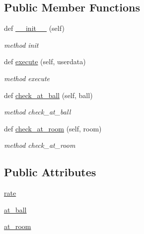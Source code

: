 \subsection*{Public Member Functions}
\begin{DoxyCompactItemize}
\item 
def \hyperlink{classbehavior__manager_1_1Find__track__behaviour_a1c9e21684b80b7c55250e5c51db162ef}{\+\_\+\+\_\+init\+\_\+\+\_\+} (self)
\begin{DoxyCompactList}\small\item\em method init \end{DoxyCompactList}\item 
def \hyperlink{classbehavior__manager_1_1Find__track__behaviour_abc08716d3814807c7e310a1726b1f0d2}{execute} (self, userdata)
\begin{DoxyCompactList}\small\item\em method execute \end{DoxyCompactList}\item 
def \hyperlink{classbehavior__manager_1_1Find__track__behaviour_a07860df69cff5dfcd0f0e1d06127b831}{check\+\_\+at\+\_\+ball} (self, ball)
\begin{DoxyCompactList}\small\item\em method check\+\_\+at\+\_\+ball \end{DoxyCompactList}\item 
def \hyperlink{classbehavior__manager_1_1Find__track__behaviour_a6d00b24d466d797df6db40960c8117c3}{check\+\_\+at\+\_\+room} (self, room)
\begin{DoxyCompactList}\small\item\em method check\+\_\+at\+\_\+room \end{DoxyCompactList}\end{DoxyCompactItemize}
\subsection*{Public Attributes}
\begin{DoxyCompactItemize}
\item 
\hyperlink{classbehavior__manager_1_1Find__track__behaviour_a2f4d1da1a2f987c83f65f22ecdf52735}{rate}
\item 
\hyperlink{classbehavior__manager_1_1Find__track__behaviour_a6e7788d035404b0eaf79ad5e03fcb697}{at\+\_\+ball}
\item 
\hyperlink{classbehavior__manager_1_1Find__track__behaviour_a88ccf669e65adb99390ee8690b7b7b47}{at\+\_\+room}
\end{DoxyCompactItemize}


